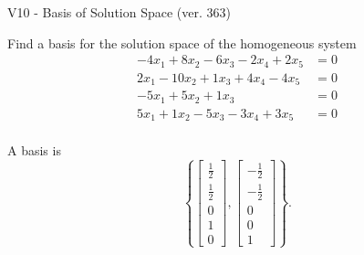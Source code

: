 \begin{exercise}
  \begin{exerciseTitle}V10 - Basis of Solution Space (ver. 363)\end{exerciseTitle}
  \begin{exerciseStatement}
    Find a basis for the solution space of the homogeneous system 
\begin{align*}
 -4 x_ 1 + 8 x_ 2 -6 x_ 3 -2 x_ 4 + 2 x_ 5 &= 0  \\ 
  2 x_ 1 -10 x_ 2 + 1 x_ 3 + 4 x_ 4 -4 x_ 5 &= 0  \\ 
  -5 x_ 1 + 5 x_ 2 + 1 x_ 3 &= 0  \\ 
  5 x_ 1 + 1 x_ 2 -5 x_ 3 -3 x_ 4 + 3 x_ 5 &= 0  \\ 
 \end{align*}


 
  \end{exerciseStatement}

  \begin{exerciseAnswer}
   A basis is   
\[\left\{\left[\begin{array}{c}
\frac{1}{2} \\
\frac{1}{2} \\
0 \\
1 \\
0
\end{array}\right] , \left[\begin{array}{c}
-\frac{1}{2} \\
-\frac{1}{2} \\
0 \\
0 \\
1
\end{array}\right]\right\}.\]

  


  \end{exerciseAnswer}
\end{exercise}